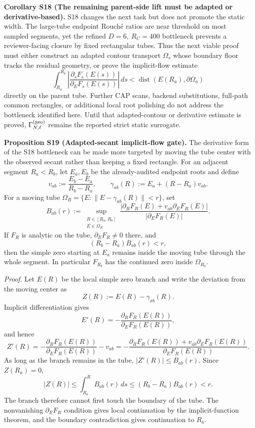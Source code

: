 \documentclass[aps,prd,onecolumn,notitlepage,nofootinbib,superscriptaddress,11pt,floatfix]{revtex4-2}
\begin{document}
\medskip\noindent\textbf{Corollary S18 (The remaining parent-side lift must be adapted or derivative-based).}
S18 changes the next task but does not promote the static width.  The large-tube endpoint Rouché ratios are near threshold on most sampled segments, yet the refined \(D=6,\ R_C=400\) bottleneck prevents a reviewer-facing closure by fixed rectangular tubes.  Thus the next viable proof must either construct an adapted contour transport \(\Omega_s\) whose boundary floor tracks the residual geometry, or prove the implicit-flow estimate
\[
\int_{R_a}^{R_b}
\left|
\frac{\partial_sF_s(E(s))}{\partial_EF_s(E(s))}
\right|\,ds
<
\operatorname{dist}(E(R_a),\partial\Omega_a)
\]
directly on the parent tube.  Further CAP scans, backend substitutions, full-path common rectangles, or additional local root polishing do not address the bottleneck identified here.  Until that adapted-contour or derivative estimate is proved, \(\Gamma_{N,\ell}^{\rm(geo)}\) remains the reported strict static surrogate.

\medskip\noindent\textbf{Proposition S19 (Adapted-secant implicit-flow gate).}
The derivative form of the S18 bottleneck can be made more targeted by moving the tube center with the observed secant rather than keeping a fixed rectangle.  For an adjacent segment \(R_a<R_b\), let \(E_a,E_b\) be the already-audited endpoint roots and define
\[
v_{ab}:=\frac{E_b-E_a}{R_b-R_a},
\qquad
\gamma_{ab}(R):=E_a+(R-R_a)v_{ab}.
\]
For a moving tube \(\Omega_R=\{E:\|E-\gamma_{ab}(R)\|<r\}\), set
\[
B_{ab}(r):=
\sup_{\substack{R\in[R_a,R_b]\\ E\in\Omega_R}}
\frac{\left|\partial_RF_R(E)+v_{ab}\partial_EF_R(E)\right|}
     {\left|\partial_EF_R(E)\right|}.
\]
If \(F_R\) is analytic on the tube, \(\partial_EF_R\ne0\) there, and
\[
(R_b-R_a)B_{ab}(r)<r,
\]
then the simple zero starting at \(E_a\) remains inside the moving tube through the whole segment.  In particular \(F_{R_b}\) has the continued zero inside \(\Omega_{R_b}\).

\emph{Proof.}
Let \(E(R)\) be the local simple zero branch and write the deviation from the moving center as
\[
Z(R):=E(R)-\gamma_{ab}(R).
\]
Implicit differentiation gives
\[
E'(R)=-\frac{\partial_RF_R(E(R))}{\partial_EF_R(E(R))},
\]
and hence
\[
Z'(R)
=
-\frac{\partial_RF_R(E(R))}{\partial_EF_R(E(R))}-v_{ab}
=
-\frac{\partial_RF_R(E(R))+v_{ab}\partial_EF_R(E(R))}
       {\partial_EF_R(E(R))}.
\]
As long as the branch remains in the tube, \(|Z'(R)|\le B_{ab}(r)\).  Since \(Z(R_a)=0\),
\[
|Z(R)|\le \int_{R_a}^{R}B_{ab}(r)\,ds
\le (R_b-R_a)B_{ab}(r)<r.
\]
The branch therefore cannot first touch the boundary of the tube.  The nonvanishing \(\partial_EF_R\) condition gives local continuation by the implicit-function theorem, and the boundary contradiction gives continuation to \(R_b\).
\end{document}
